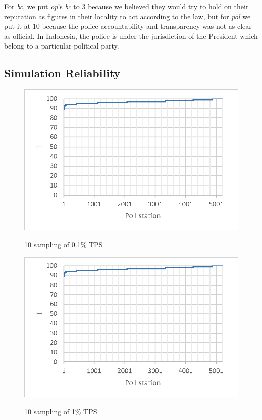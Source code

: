 \documentclass[JIP]{ipsj}
\begin{document}
For \textit{bc}, we put \textit{op}'s \textit{bc} to 3 because we believed they would try to hold on their reputation as figures in their locality to act according to the law, but for \textit{pol} we put it at 10 because the police accountability and transparency was not as clear as official. In Indonesia, the police is under the jurisdiction of the President which belong to a particular political party.


\subsection{Simulation Reliability}%

\begin{figure}[tb]%
\vbox{\it
  \hbox{\includegraphics[scale=0.6]{images/Trustworthiness3.eps}}}
\centerline{}
\caption{10 sampling of 0.1\% TPS}
\label{fig:sampling100}
\end{figure}

\begin{figure}[tb]%
\vbox{\it
  \hbox{\includegraphics[scale=0.6]{images/Trustworthiness3.eps}}}
\centerline{}
\caption{10 sampling of 1\% TPS}
\label{fig:sampling1k}
\end{figure}
\end{document}
